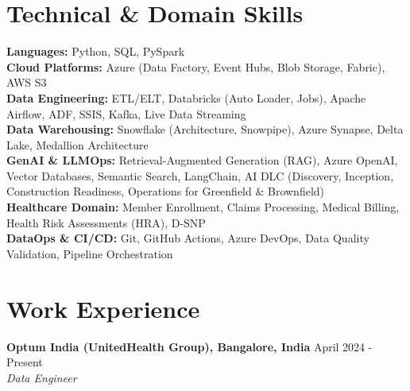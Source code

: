 \documentclass[a4paper,8pt]{article}
\begin{document}
\section{Technical \& Domain Skills}
\vspace{0.2cm}
\color[HTML]{1C033C}\textbf{Languages:} Python, SQL, PySpark\\[3pt]
\color[HTML]{1C033C}\textbf{Cloud Platforms:} Azure (Data Factory, Event Hubs, Blob Storage, Fabric), AWS S3\\[3pt]
\color[HTML]{1C033C}\textbf{Data Engineering:} ETL/ELT, Databricks (Auto Loader, Jobs), Apache Airflow, ADF, SSIS, Kafka, Live Data Streaming\\[3pt]
\color[HTML]{1C033C}\textbf{Data Warehousing:} Snowflake (Architecture, Snowpipe), Azure Synapse, Delta Lake, Medallion Architecture\\[3pt]
\color[HTML]{1C033C}\textbf{GenAI \& LLMOps:} Retrieval-Augmented Generation (RAG), Azure OpenAI, Vector Databases, Semantic Search, LangChain, AI DLC (Discovery, Inception, Construction Readiness, Operations for Greenfield \& Brownfield)\\[3pt]
\color[HTML]{1C033C}\textbf{Healthcare Domain:} Member Enrollment, Claims Processing, Medical Billing, Health Risk Assessments (HRA), D-SNP\\[3pt]
\color[HTML]{1C033C}\textbf{DataOps \& CI/CD:} Git, GitHub Actions, Azure DevOps, Data Quality Validation, Pipeline Orchestration\\[3pt]
\vspace{-0.3cm}


\section{Work Experience}
\vspace{0.2cm}

\noindent
\textbf{Optum India (UnitedHealth Group), Bangalore, India} \hfill \textcolor[HTML]{371e77}{April 2024 - Present} \\
\textit{\textcolor[HTML]{371e77}{Data Engineer}}\\[-1.7em]
\end{document}
